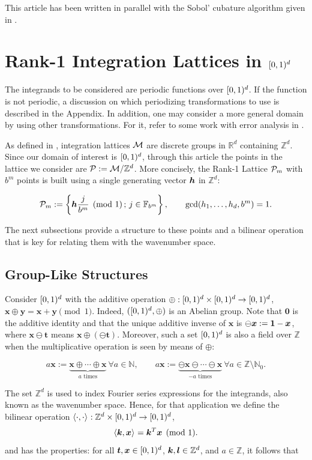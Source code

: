 \documentclass[graybox]{svmult}
\newcommand{\Z}{\mathbb{Z}} %
\newcommand{\R}{\mathbb{R}} %
\newcommand{\N}{\mathbb{N}} %
\newcommand{\F}{\mathbb{F}} %
\newcommand{\bszero}{\boldsymbol{0}} %
\newcommand{\bst}{\boldsymbol{t}}    %
\newcommand{\bsx}{\boldsymbol{x}}    %
\newcommand{\bsy}{\boldsymbol{y}}    %
\begin{document}
This article has been written in parallel with the Sobol' cubature algorithm given in \cite{HicJim16a}.

\section{Rank-1 Integration Lattices in $[0,1)^d$}\label{secrank1lat}
The integrands to be considered are periodic functions over $[0,1)^d$. If the function is not periodic, a discussion on which periodizing transformations to use is described in the Appendix. In addition, one may consider a more general domain by using other transformations. For it, refer to some work with error analysis in \cite{HicSloWas03a,HicSloWas03e}.

As defined in \cite[Sec. 2.7-2.8]{SloJoe94}, integration lattices $\mathcal{M}$ are discrete groups in $\R^d$ containing $\Z^d$. Since our domain of interest is $[0,1)^d$, through this article the points in the lattice we consider are $\cp:=\cm/\Z^d$. More concisely, the Rank-1 Lattice $\mathcal{P}_m$ with $b^m$ points is built using a single generating vector $\boldsymbol{h}$ in $\Z^d$:

\begin{equation}\label{latdef}
\cp_m :=\left\{\bsh\frac{j}{b^m}\pmod 1\, ;\, j\in\F_{b^m}\right\},\qquad \gcd(h_1,\dots,h_d,b^m)=1.
\end{equation}

The next subsections provide a structure to these points and a bilinear operation that is key for relating them with the wavenumber space.

\subsection{Group-Like Structures}
Consider $[0,1)^d$ with the additive operation $\oplus:[0,1)^d \times [0,1)^d \to [0,1)^d$, $\bsx\oplus\bsy=\bsx+\bsy\pmod 1$. Indeed, $([0,1)^d,\oplus)$ is an Abelian group. Note that $\bszero$ is the additive identity and that the unique additive inverse of $\bsx$ is $\ominus \bsx:=\bold{1}-\bsx$, where $\bsx \ominus \bst$ means $\bsx \oplus (\ominus \bst)$. Moreover, such a set $[0,1)^d$ is also a field over $\Z$ when the multiplicative operation is seen by means of $\oplus$:

\[
a \bsx:=\underbrace{\bsx \oplus \cdots \oplus \bsx}_{a \text{ times}}\ \forall a \in \N, \qquad a \bsx:=\underbrace{\ominus\bsx \ominus \cdots \ominus \bsx}_{-a \text{ times}}\ \forall a \in \Z\setminus\N_0.
\]
 
The set $\Z^d$ is used to index Fourier series expressions for the integrands, also known as the wavenumber space. Hence, for that application we define the bilinear operation $\ip{\cdot}{\cdot}: \Z^d \times \cube \to \cube$, 
\begin{equation}\label{bilinear}
\ip{\bsk}{\bsx}=\bsk^T\bsx\pmod 1.
\end{equation}
and has the properties: for all $\bst, \bsx \in \cube$, $\bsk, \bsl \in \Z^d$, and $a \in \Z$, it follows that
\end{document}
